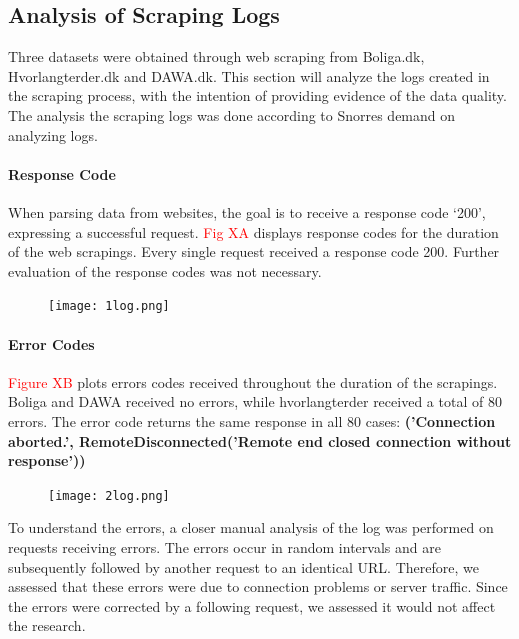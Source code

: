 \documentclass[12pt,a4paper]{article}
\begin{document}
\subsection{Analysis of Scraping Logs}
Three datasets were obtained through web scraping from Boliga.dk, Hvorlangterder.dk and DAWA.dk. This section will analyze the logs created in the scraping process, with the intention of providing evidence of the data quality. The analysis the scraping logs was done according to Snorres demand on analyzing logs. 
\paragraph{Response Code\newline}
When parsing data from websites, the goal is to receive a response code ‘200’, expressing a successful request. \textcolor{red}{Fig XA} displays response codes for the duration of the web scrapings. Every single request received a response code 200. Further evaluation of the response codes was not necessary.
\begin{figure}[H]
  \centering
   \caption{}
   \texttt{[image: 1log.png]} 
  \label{fig:}
\end{figure}

\paragraph{Error Codes\newline}
\textcolor{red}{Figure XB} plots errors codes received throughout the duration of the scrapings. Boliga and DAWA received no errors, while hvorlangterder received a total of 80 errors. The error code returns the same response in all 80 cases: \small{\textbf{('Connection aborted.', RemoteDisconnected('Remote end closed connection without response'))}}
\begin{figure}[H]
  \centering
   \caption{}
   \texttt{[image: 2log.png]} 
  \label{fig:}
\end{figure}
To understand the errors, a closer manual analysis of the log was performed on requests receiving errors. The errors occur in random intervals and are subsequently followed by another request to an identical URL. Therefore, we assessed that these errors were due to connection problems or server traffic. Since the errors were corrected by a following request, we assessed it would not affect the research.
\end{document}
